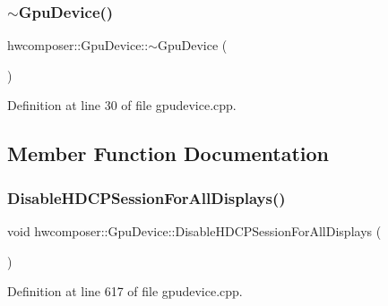 \subsubsection{\texorpdfstring{$\sim$\+Gpu\+Device()}{~GpuDevice()}}
{\footnotesize\ttfamily hwcomposer\+::\+Gpu\+Device\+::$\sim$\+Gpu\+Device (\begin{DoxyParamCaption}{ }\end{DoxyParamCaption})\hspace{0.3cm}{\ttfamily [virtual]}}



Definition at line 30 of file gpudevice.\+cpp.


\begin{DoxyCode}{0}
\end{DoxyCode}


\subsection{Member Function Documentation}
\mbox{\label{classhwcomposer_1_1GpuDevice_a7038e1dc3d4a2be7206e6a35717521e2}} 
\subsubsection{\texorpdfstring{Disable\+H\+D\+C\+P\+Session\+For\+All\+Displays()}{DisableHDCPSessionForAllDisplays()}}
{\footnotesize\ttfamily void hwcomposer\+::\+Gpu\+Device\+::\+Disable\+H\+D\+C\+P\+Session\+For\+All\+Displays (\begin{DoxyParamCaption}{ }\end{DoxyParamCaption})}



Definition at line 617 of file gpudevice.\+cpp.


